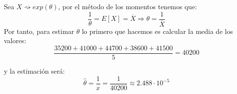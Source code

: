 \begin{ejercicio}
    \noindent
    Sea $X\rightsquigarrow exp(\theta)$, por el método de los momentos tenemos que:
    \begin{equation*}
        \frac{1}{\theta} = E[X] = \overline{X} \Longrightarrow \theta = \frac{1}{\overline{X}}
    \end{equation*}
    Por tanto, para estimar $\theta$ lo primero que hacemos es calcular la media de los valores:
    \begin{equation*}
        \frac{35200 + 41000 + 44700 + 38600 + 41500}{5} = 40200
    \end{equation*}

    y la estimación será:
    \begin{equation*}
        \hat{\theta} = \frac{1}{\overline{x}} = \frac{1}{40200} \approx 2.488\cdot 10^{-5}
    \end{equation*}
\end{ejercicio}
